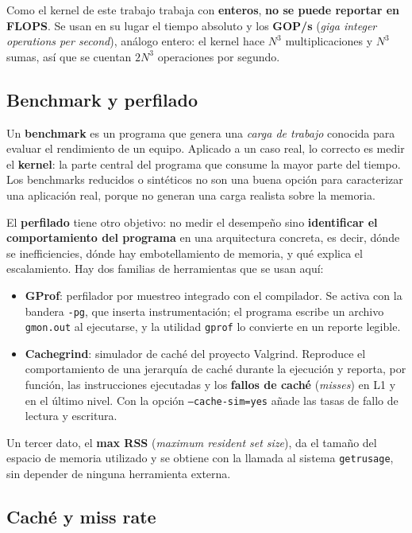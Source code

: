 Como el kernel de este trabajo trabaja con \textbf{enteros}, \textbf{no se puede reportar en FLOPS}. Se usan en su lugar el tiempo absoluto y los \textbf{GOP/s} (\textit{giga integer operations per second}), análogo entero: el kernel hace $N^3$ multiplicaciones y $N^3$ sumas, así que se cuentan $2N^3$ operaciones por segundo.

\subsection{Benchmark y perfilado}

Un \textbf{benchmark} es un programa que genera una \emph{carga de trabajo} conocida para evaluar el rendimiento de un equipo. Aplicado a un caso real, lo correcto es medir el \textbf{kernel}: la parte central del programa que consume la mayor parte del tiempo. Los benchmarks reducidos o sintéticos no son una buena opción para caracterizar una aplicación real, porque no generan una carga realista sobre la memoria.

El \textbf{perfilado} tiene otro objetivo: no medir el desempeño sino \textbf{identificar el comportamiento del programa} en una arquitectura concreta, es decir, dónde se inefficiencies, dónde hay embotellamiento de memoria, y qué explica el escalamiento. Hay dos familias de herramientas que se usan aquí:

\begin{itemize}
    \item \textbf{GProf}: perfilador por muestreo integrado con el compilador. Se activa con la bandera \texttt{-pg}, que inserta instrumentación; el programa escribe un archivo \texttt{gmon.out} al ejecutarse, y la utilidad \texttt{gprof} lo convierte en un reporte legible.
    \item \textbf{Cachegrind}: simulador de caché del proyecto Valgrind. Reproduce el comportamiento de una jerarquía de caché durante la ejecución y reporta, por función, las instrucciones ejecutadas y los \textbf{fallos de caché} (\textit{misses}) en L1 y en el último nivel. Con la opción \texttt{--cache-sim=yes} añade las tasas de fallo de lectura y escritura.
\end{itemize}

Un tercer dato, el \textbf{max RSS} (\textit{maximum resident set size}), da el tamaño del espacio de memoria utilizado y se obtiene con la llamada al sistema \texttt{getrusage}, sin depender de ninguna herramienta externa.

\subsection{Caché y miss rate}

